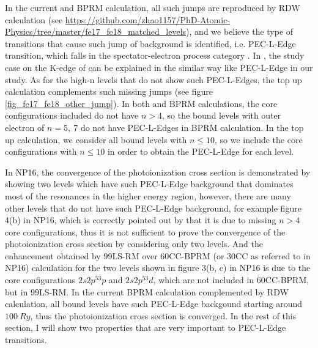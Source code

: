 In the current  and  BPRM calculation, all such jumps are reproduced by RDW calculation (see \url{https://github.com/zhao1157/PhD-Atomic-Physics/tree/master/fe17\_fe18\_matched\_levels}), and we believe the type of transitions that cause such jump of background is identified, i.e. PEC-L-Edge transition, which falls in the spectator-electron process category \citep{mendoza_2018}. In \citet{mendoza_2018}, the study case on the K-edge of  can be explained in the similar way like PEC-L-Edge in our study. As for the high-n levels that do not show such PEC-L-Edges, the top up calculation complements such missing jumps (see figure \ref{fig_fe17_fe18_other_jump}). In both   and  BPRM calculations, the core configurations included do not have $n>4$, so the bound levels with outer electron of $n=5,~7$ do not have PEC-L-Edges in BPRM calculation. In the top up calculation, we consider all bound levels with $n\leq10$, so we include the core configurations with $n\leq10$ in order to obtain the PEC-L-Edge for each level.

In NP16, the convergence of the photoionization cross section is demonstrated by showing two levels which have such PEC-L-Edge background that dominates most of the resonances in the higher energy region, however, there are many other levels that do not have such PEC-L-Edge background, for example figure 4(b) in NP16, which is correctly pointed out by \citet{more_comment_2017} that it is due to missing $n>4$ core configurations, thus it is not sufficient to prove the convergence of the photoionization cross section by considering only two levels. And the enhancement obtained by 99LS-RM over 60CC-BPRM (or 30CC as referred to in NP16) calculation for the two levels shown in figure 3(b, c) in NP16 is due to the core configurations $2s2p^53p$ and $2s2p^53d$, which are not included in 60CC-BPRM, but in 99LS-RM. In the current BPRM calculation complemented by RDW calculation, all bound levels have such PEC-L-Edge backgound starting around $100~Ry$, thus the photoionization cross section is converged. In the rest of this section, I will show two properties that are very important to PEC-L-Edge transitions.

